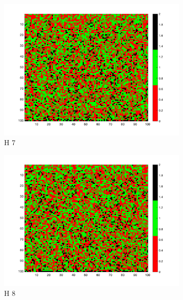 \documentclass[unicode,11pt,a4paper,oneside,numbers=endperiod,openany]{scrartcl}
\begin{document}
\begin{figure}[H]
\begin{subfigure}[b]{0.3\textwidth}
        \includegraphics[width=\textwidth]{results/iterations_1056_H_7_random_1.png}
        \caption{H 7}
        \label{fig:image7}
      \end{subfigure}
      \begin{subfigure}[b]{0.3\textwidth}
        \includegraphics[width=\textwidth]{results/iterations_1002_H_8_random_1.png}
        \caption{H 8}
        \label{fig:image8}
      \end{subfigure}
      \begin{subfigure}[b]{0.3\textwidth}

\end{subfigure}
\end{figure}
\end{document}
